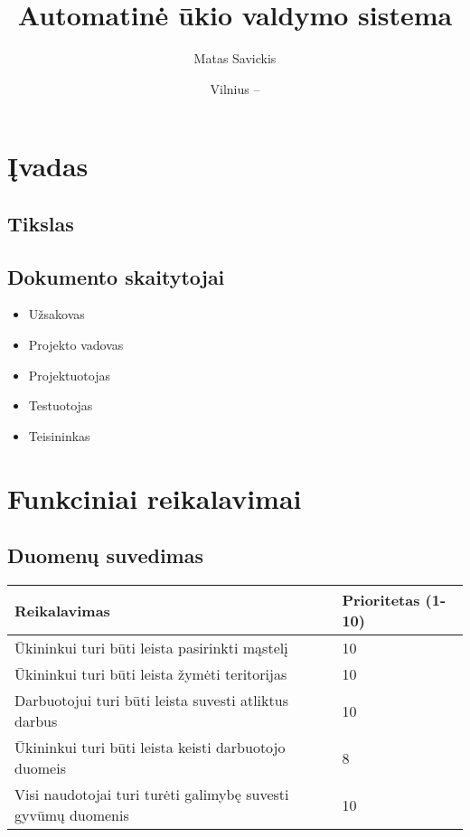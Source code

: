\documentclass[oneside]{VUMIFPSkursinis}
\title{Automatinė ūkio valdymo sistema}
\author{Matas Savickis}
\date{Vilnius – \the\year}
\begin{document}
\maketitle

\tableofcontents
\centering

\section{Įvadas}
\subsection{Tikslas}
\subsection{Dokumento skaitytojai}
\begin{itemize}
	\item Užsakovas
	\item Projekto vadovas
	\item Projektuotojas
	\item Testuotojas
	\item Teisininkas
\end{itemize}

\section{Funkciniai reikalavimai}
\subsection{Duomenų suvedimas}

\begin{table}[htbp]
	\begin{tabularx}{1\textwidth}{ |X|P{3cm }| }
       	          \hline
           	Reikalavimas &  Prioritetas (1-10)  \\   \hline 
        		Ūkininkui turi būti leista pasirinkti mąstelį &  10  \\   \hline
         		Ūkininkui turi būti leista žymėti teritorijas &  10  \\   \hline
        		Darbuotojui turi būti leista suvesti atliktus darbus & 10  \\   \hline
        		Ūkininkui turi būti leista keisti darbuotojo duomeis & 8 \\ \hline
        		Visi naudotojai turi turėti galimybę suvesti gyvūmų duomenis & 10 \\ \hline
	\end{tabularx}
\end{table}
\end{document}
